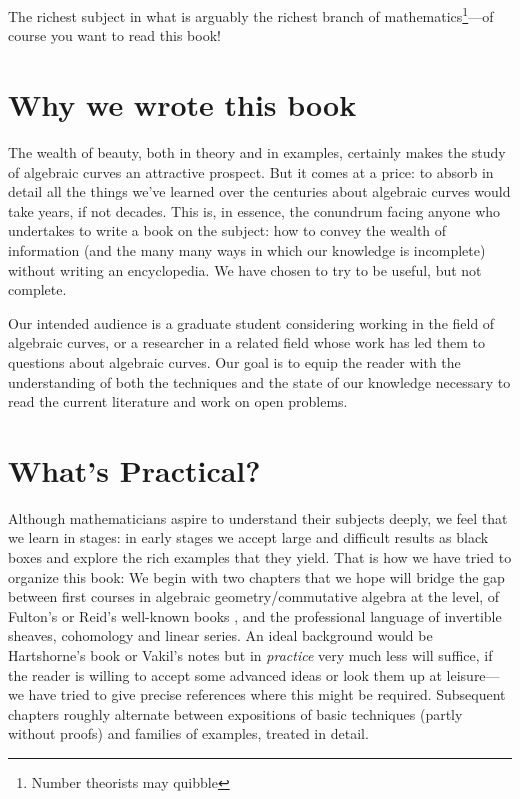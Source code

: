 The richest subject in what is arguably the richest branch of mathematics\footnote{Number theorists may quibble}---of course you want to read this book! 

\section{Why we wrote this book}

The wealth of beauty, both in theory and in examples, certainly makes the study of algebraic curves an attractive prospect. But it comes at a price: to absorb in detail all the things we've learned over the centuries about algebraic curves would take years, if not decades. This is, in essence, the conundrum facing anyone who undertakes to write a book on the subject: how to convey the wealth of information  (and the many many ways in which our knowledge is incomplete) without writing an encyclopedia. We have chosen to try to be useful, but not complete.

Our intended audience is a graduate student considering working in the field of algebraic curves, or a researcher in a related field whose work has led them to questions about algebraic curves. Our goal is to equip the reader with the understanding of both the techniques and the state of our knowledge necessary to read the current literature and work on open problems.

\section{What's Practical?}

Although mathematicians aspire to understand their subjects deeply, we feel that we learn in stages: in early stages we accept large and difficult results as black boxes and explore the rich examples that they yield. That is how we have tried to organize this book: 
We begin with two chapters that we hope will bridge the gap between first courses in algebraic geometry/commutative algebra at the level,  of Fulton's or  Reid's well-known books \cite{Fulton1989}, \cite{MR982494} and the professional language of invertible sheaves, cohomology and linear series. An ideal background would
be Hartshorne's book \cite{Hartshorne1977} or Vakil's notes \cite{Vakil-notes} but in \emph{practice} very much less will suffice, if the reader is willing to accept some advanced ideas or look them up at leisure---we have tried to give precise references where this might be required. Subsequent chapters roughly alternate between expositions of basic techniques (partly without proofs) and families of examples, treated in detail. 

